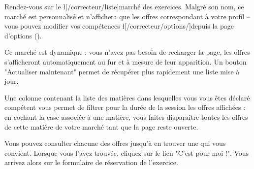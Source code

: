 ﻿Rendez-vous sur le \l[/correcteur/liste]{marché des exercices}. Malgré son nom, ce marché est personnalisé et n'affichera que les offres correspondant à votre profil  -- vous pouvez modifier vos compétences \l[/correcteur/options/]{depuis la page d'options} ().

Ce marché est dynamique : vous n'avez pas besoin de recharger la page, les offres s'afficheront automatiquement au fur et à mesure de leur apparition. Un bouton "Actualiser maintenant" permet de récupérer plus rapidement une liste mise à jour.

Une colonne contenant la liste des matières dans lesquelles vous vous êtes déclaré compétent vous permet de filtrer pour la durée de la session les offres affichées : en cochant la case associée à une matière, vous faites disparaître toutes les offres de cette matière de votre marché tant que la page reste ouverte.

Vous pouvez consulter chacune des offres jusqu'à en trouver une qui vous convient.
Lorsque vous l'avez trouvée, cliquez sur le lien "C'est pour moi !".
Vous arrivez alors sur le formulaire de réservation de l'exercice.